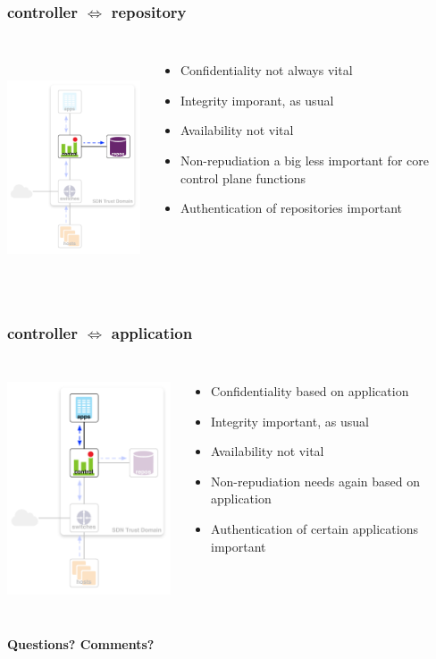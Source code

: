 \documentclass[t,handout]{beamer}
\begin{document}
\begin{frame}
\frametitle{controller $\Longleftrightarrow$ repository}
\begin{columns}[T]
\includegraphics[height=2.75in]{ra-c-r}
\begin{itemize}
\item {\color{orange} Confidentiality not always vital}
\item {\color{red} Integrity imporant, as usual}
\item {\color{green} Availability not vital} 
\item {\color{green} Non-repudiation a big less important for core control plane functions}
\item {\color{red} Authentication of repositories important}
\end{itemize}
\end{columns}
\end{frame}

\begin{frame}
\frametitle{controller $\Longleftrightarrow$  application}
\begin{columns}[T]
\includegraphics[height=2.75in]{ra-c-a}
\begin{itemize}
\item {\color{orange} Confidentiality based on application}
\item {\color{red} Integrity important, as usual}
\item {\color{green} Availability not vital} 
\item {\color{green} Non-repudiation needs again based on application}
\item {\color{red} Authentication of certain applications important}
\end{itemize}
\end{columns}
\end{frame}

\begin{frame}[c]
\begin{center}
\textbf{Questions? Comments?}
\end{center}
\end{frame}
\end{document}
